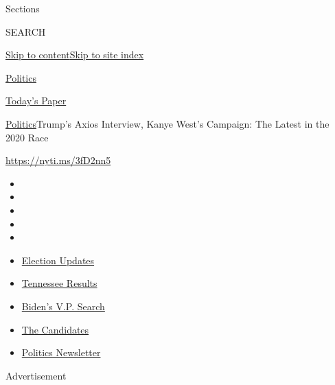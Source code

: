 Sections

SEARCH

\protect\hyperlink{site-content}{Skip to
content}\protect\hyperlink{site-index}{Skip to site index}

\href{https://www.nytimes.com/section/politics}{Politics}

\href{https://myaccount.nytimes.com/auth/login?response_type=cookie\&client_id=vi}{}

\href{https://www.nytimes.com/section/todayspaper}{Today's Paper}

\href{/section/politics}{Politics}\textbar{}Trump's Axios Interview,
Kanye West's Campaign: The Latest in the 2020 Race

\href{https://nyti.ms/3fD2nn5}{https://nyti.ms/3fD2nn5}

\begin{itemize}
\item
\item
\item
\item
\item
\end{itemize}

\begin{itemize}
\item
  \href{https://www.nytimes.com/2020/08/07/us/elections/biden-vs-trump.html?action=click\&pgtype=Article\&state=default\&region=TOP_BANNER\&context=storylines_menu}{Election
  Updates}
\item
  \href{https://www.nytimes.com/interactive/2020/08/06/us/elections/results-tennessee-primary-elections.html?action=click\&pgtype=Article\&state=default\&region=TOP_BANNER\&context=storylines_menu}{Tennessee
  Results}
\item
  \href{https://www.nytimes.com/article/biden-vice-president-2020.html?action=click\&pgtype=Article\&state=default\&region=TOP_BANNER\&context=storylines_menu}{Biden's
  V.P. Search}
\item
  \href{https://www.nytimes.com/interactive/2019/us/politics/2020-presidential-candidates.html?action=click\&pgtype=Article\&state=default\&region=TOP_BANNER\&context=storylines_menu}{The
  Candidates}
\item
  \href{https://www.nytimes.com/newsletters/politics?action=click\&pgtype=Article\&state=default\&region=TOP_BANNER\&context=storylines_menu}{Politics
  Newsletter}
\end{itemize}

Advertisement

